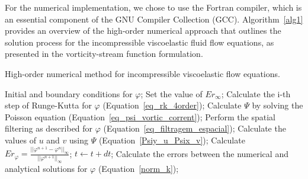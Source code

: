 \documentclass[preprint, 12pt]{elsarticle}
\begin{document}
For the numerical implementation, we chose to use the Fortran compiler, which is an essential component of the GNU Compiler Collection (GCC). Algorithm~\ref{alg1} provides an overview of the high-order numerical approach that outlines the solution process for the incompressible viscoelastic fluid flow equations, as presented in the vorticity-stream function formulation.

\begin{algorithm}
\caption{High-order numerical method for incompressible viscoelastic flow equations.}
\label{alg1}
\begin{algorithmic}[1]
  \State Initial and boundary conditions for $\varphi$;
  \State Set the value of $Er_{\infty}$; 
       \State Calculate the i-th step of Runge-Kutta for $\varphi$ (Equation~\ref{eq_rk_4order});
       \State Calculate $\Psi$ by solving the Poisson equation (Equation~\ref{eq_psi_vortic_corrent});
       \State Perform the spatial filtering as described for $\varphi$ (Equation~\ref{eq_filtragem_espacial});
       \State Calculate the values of $u$ and $v$ using $\Psi$ (Equation~\ref{Psiy_u_Psix_v});
    \EndFor
    \State Calculate $Er_{\varphi} = \frac{||\varphi^{n+1} - \varphi^{n}||_{\infty}}{||\varphi^{n+1}||_{\infty}}$; 
    \State $t \gets t + dt $; 
  \EndWhile
  \State Calculate the errors between the numerical and analytical solutions for $\varphi$ (Equation~\eqref{norm_k});
\EndFunction
\end{algorithmic}
\end{algorithm}
\normalsize
\end{document}
